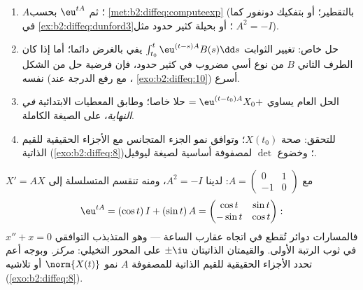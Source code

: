 \begin{method}[حل $X' = AX + B(t)$، من البداية إلى النهاية]\label{met:b2:diffeq:solvelinear}
\begin{enumerate}
  \item {} $A$؛ ثم $\eu^{tA}$ بحسب
        \cref{met:b2:diffeq:computeexp} (بالتقطير؛ أو بتفكيك دونفور كما في
        \cref{ex:b2:diffeq:dunford3}؛ أو بحيلة كثير حدود مثل $A^2 = -I$).
  \item حل خاص: تغيير الثوابت $\int_{t_0}^t\eu^{(t-s)A}B(s)\dd s$ يفي بالغرض دائما؛ أما إذا كان
        الطرف الثاني $B$ من نوع أسي مضروب في كثير حدود، فإن
        فرضية حل من الشكل نفسه (مع رفع الدرجة عند ،
        \cref{exo:b2:diffeq:10}) أسرع.
  \item الحل العام يساوي $= \eu^{(t-t_0)A}X_0 +$ حلا خاصا؛ وطابق المعطيات الابتدائية
        \emph{في النهاية}، على الصيغة الكاملة.
  \item للتحقق: صحة $X(t_0)$؛ وتوافق نمو الجزء المتجانس مع الأجزاء
        الحقيقية للقيم الذاتية (\cref{exo:b2:diffeq:8})؛ وخضوع $\det$ لمصفوفة أساسية
        لصيغة ليوفيل.
\end{enumerate}
\end{method}

\begin{example}\label{ex:b2:diffeq:phaseportrait}
$X' = AX$ مع $A = \begin{pmatrix} 0 & 1\\ -1 & 0\end{pmatrix}$:
لدينا $A^2 = -I$، ومنه تنقسم المتسلسلة إلى
\[
\eu^{tA} = (\cos t)\,I + (\sin t)\,A
= \begin{pmatrix} \cos t & \sin t\\ -\sin t & \cos t
\end{pmatrix} :
\]
فالمسارات دوائر تُقطع في اتجاه عقارب الساعة --- وهو المتذبذب التوافقي
$x'' + x = 0$ في ثوب الرتبة الأولى. والقيمتان الذاتيتان $\pm\iu$ على المحور
التخيلي: \emph{مركز}. وبوجه أعم تحدد الأجزاء الحقيقية للقيم الذاتية
للمصفوفة $A$ نمو $\norm{X(t)}$ أو تلاشيه
(\cref{exo:b2:diffeq:8}).
\end{example}

